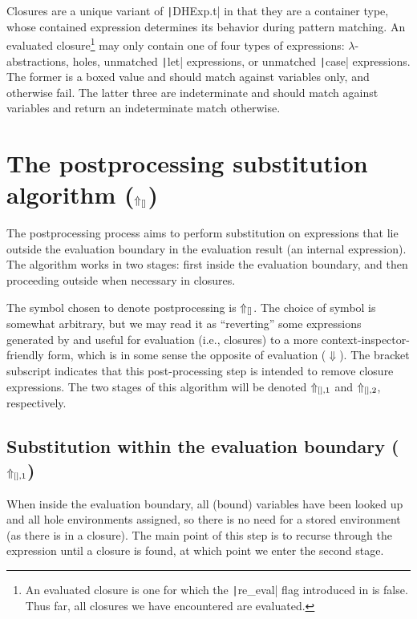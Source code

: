 Closures are a unique variant of \texttt|DHExp.t| in that they are a container type, whose contained expression determines its behavior during pattern matching. An evaluated closure\footnote{An evaluated closure is one for which the \texttt|re_eval| flag introduced in  is false. Thus far, all closures we have encountered are evaluated.} may only contain one of four types of expressions: $\lambda$-abstractions, holes, unmatched \texttt|let| expressions, or unmatched \texttt|case| expressions. The former is a boxed value and should match against variables only, and otherwise fail. The latter three are indeterminate and should match against variables and return an indeterminate match otherwise.

\section{The postprocessing substitution algorithm ($\Uparrow_{[]}$)}
\label{sec:postprocessing-substitution}

The postprocessing process aims to perform substitution on expressions that lie outside the evaluation boundary in the evaluation result (an internal expression). The algorithm works in two stages: first inside the evaluation boundary, and then proceeding outside when necessary in closures.

The symbol chosen to denote postprocessing is $\Uparrow_{[]}$. The choice of symbol is somewhat arbitrary, but we may read it as ``reverting'' some expressions generated by and useful for evaluation (i.e., closures) to a more context-inspector-friendly form, which is in some sense the opposite of evaluation ($\Downarrow$). The bracket subscript indicates that this post-processing step is intended to remove closure expressions. The two stages of this algorithm will be denoted $\Uparrow_{[],1}$ and $\Uparrow_{[],2}$, respectively.

\subsection{Substitution within the evaluation boundary ($\Uparrow_{[],1}$)}
\label{sec:postprocessing-subst-inside}

When inside the evaluation boundary, all (bound) variables have been looked up and all hole environments assigned, so there is no need for a stored environment (as there is in a closure). The main point of this step is to recurse through the expression until a closure is found, at which point we enter the second stage.

